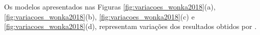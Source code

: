 \begin{figure}[h!]
	\centering
	\captionsetup{width=15cm}
	{}	
\end{figure}

\newpage

Os modelos apresentados nas Figuras \ref{fig:variacoes_wonka2018}(a), \ref{fig:variacoes_wonka2018}(b), \ref{fig:variacoes_wonka2018}(c) e \ref{fig:variacoes_wonka2018}(d), representam variações dos resultados obtidos por .

